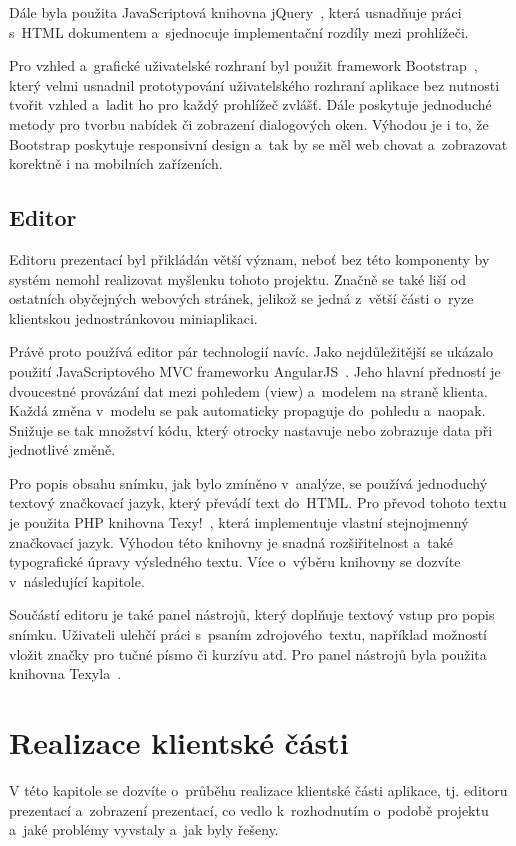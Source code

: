 \documentclass[11pt,twoside,a4paper]{book}
\newcommand*{\nom}[2]{#1\nomenclature{#1}{#2}} 			%
\begin{document}
Dále byla použita Java\-Scriptová knihovna jQuery~\cite{jQuery}, která usnadňuje práci s~HTML dokumentem a~sjednocuje imple\-mentační rozdíly mezi prohlížeči.

Pro vzhled a~grafické uživatelské rozhraní byl použit framework Bootstrap~\cite{bootstrap}, který velmi usnadnil prototypování uživatelského rozhraní aplikace bez nutnosti tvořit vzhled a~ladit ho pro každý prohlížeč zvlášť. Dále poskytuje jednoduché metody pro tvorbu nabídek či zobrazení dialogových oken. Výhodou je i to, že Bootstrap poskytuje responsivní design a~tak by se měl web chovat a~zobrazovat korektně i na mobilních zařízeních.


\section{Editor}
Editoru prezentací byl přikládán větší význam, neboť bez této komponenty by systém nemohl realizovat myšlenku tohoto projektu. Značně se také liší od ostatních obyčejných webových stránek, jelikož se jedná z~větší části o~ryze klientskou jednostránkovou mini\-aplikaci.

Právě proto používá editor pár technologií navíc. Jako nejdůležitější se ukázalo použití Java\-Scriptového \nom{MVC}{Model-View-Controller} frameworku AngularJS~\cite{angular}. Jeho hlavní předností je dvoucestné provázání dat mezi pohledem (view) a~modelem na straně klienta. Každá změna v~modelu se pak automaticky propaguje do~pohledu a~naopak. Snižuje se tak množství kódu, který otrocky nastavuje nebo zobrazuje data při jednotlivé změně. 

Pro popis obsahu snímku, jak bylo zmíněno v~analýze, se používá jednoduchý textový značkovací jazyk, který převádí text do~HTML. Pro převod tohoto textu je použita PHP knihovna Texy!~\cite{texy}, která imple\-mentuje vlastní stejnojmenný značkovací jazyk. Výhodou této knihovny je snadná rozšiřitelnost a~také typografické úpravy výsledného textu. Více o~výběru knihovny se dozvíte v~následující kapitole.

Součástí editoru je také panel nástrojů, který doplňuje textový vstup pro popis snímku. Uživateli ulehčí práci s~psaním zdrojového~textu, například možností vložit značky pro tučné písmo či kurzívu atd. Pro panel nástrojů byla použita knihovna Texyla~\cite{texyla}.



\chapter{Realizace klientské části} \label{chap:realizace}
V této kapitole se dozvíte o~průběhu realizace klientské části aplikace, tj. editoru prezentací a~zobrazení prezentací, co vedlo k~rozhodnutím o~podobě projektu a~jaké problémy vyvstaly a~jak byly řešeny.
\end{document}
